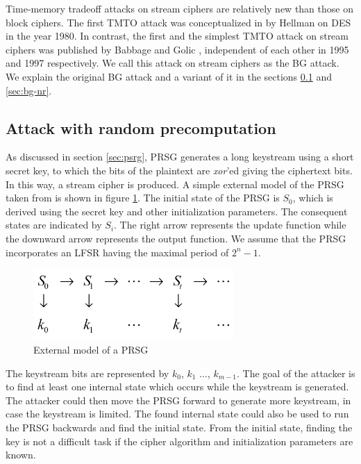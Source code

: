 Time-memory tradeoff attacks on stream ciphers are relatively new than those on block ciphers. The first TMTO attack was conceptualized in \cite{hellman1980ctm} by Hellman on DES in the year 1980. In contrast, the first and the simplest TMTO attack on stream ciphers was published by Babbage \cite{babbage} and Golic \cite{golic}, independent of each other in 1995 and 1997 respectively. We call this attack on stream ciphers as the BG attack. We explain the original BG attack and a variant of it in the sections \ref{sec:bg-r} and \ref{sec:bg-nr}.

\subsection{Attack with random precomputation}
\label{sec:bg-r}

As discussed in section \ref{sec:psrg}, PRSG generates a long keystream using a short secret key, to which the bits of the plaintext are \emph{xor}'ed giving the ciphertext bits. In this way, a stream cipher is produced. A simple external model of the PRSG taken from \cite{babbage} is shown in figure \ref{fig:psrg-model}. The initial state of the PRSG is $S_0$, which is derived using the secret key and other initialization parameters. The consequent states are indicated by $S_i$. The right arrow represents the update function while the downward arrow represents the output function. We assume that the PRSG incorporates an LFSR having the maximal period of $2^{n} - 1$.

\begin{figure}[h]
	\centering
	\includegraphics[width=3in]{./figures/prsgmodel.png}
	\caption{External model of a PRSG \cite{babbage}}	
	\label{fig:psrg-model}
\end{figure}

The keystream bits are represented by $k_0$, $k_1$ $\ldots$, $k_{m-1}$. The goal of the attacker is to find at least one internal state which occurs while the keystream is generated. The attacker could then move the PRSG forward to generate more keystream, in case the keystream is limited. The found internal state could also be used to run the PRSG backwards and find the initial state. From the initial state, finding the key is not a difficult task if the cipher algorithm and initialization parameters are known.\\

